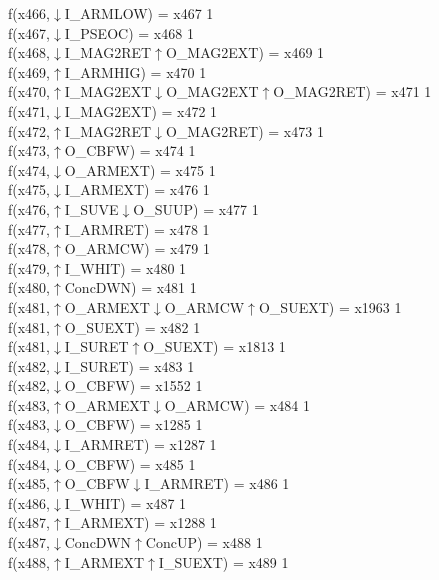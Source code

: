 f(x466,$\downarrow$I\_ARMLOW) = x467 {1} \\
f(x467,$\downarrow$I\_PSEOC) = x468 {1} \\
f(x468,$\downarrow$I\_MAG2RET$\uparrow$O\_MAG2EXT) = x469 {1} \\
f(x469,$\uparrow$I\_ARMHIG) = x470 {1} \\
f(x470,$\uparrow$I\_MAG2EXT$\downarrow$O\_MAG2EXT$\uparrow$O\_MAG2RET) = x471 {1} \\
f(x471,$\downarrow$I\_MAG2EXT) = x472 {1} \\
f(x472,$\uparrow$I\_MAG2RET$\downarrow$O\_MAG2RET) = x473 {1} \\
f(x473,$\uparrow$O\_CBFW) = x474 {1} \\
f(x474,$\downarrow$O\_ARMEXT) = x475 {1} \\
f(x475,$\downarrow$I\_ARMEXT) = x476 {1} \\
f(x476,$\uparrow$I\_SUVE$\downarrow$O\_SUUP) = x477 {1} \\
f(x477,$\uparrow$I\_ARMRET) = x478 {1} \\
f(x478,$\uparrow$O\_ARMCW) = x479 {1} \\
f(x479,$\uparrow$I\_WHIT) = x480 {1} \\
f(x480,$\uparrow$ConcDWN) = x481 {1} \\
f(x481,$\uparrow$O\_ARMEXT$\downarrow$O\_ARMCW$\uparrow$O\_SUEXT) = x1963 {1} \\
f(x481,$\uparrow$O\_SUEXT) = x482 {1} \\
f(x481,$\downarrow$I\_SURET$\uparrow$O\_SUEXT) = x1813 {1} \\
f(x482,$\downarrow$I\_SURET) = x483 {1} \\
f(x482,$\downarrow$O\_CBFW) = x1552 {1} \\
f(x483,$\uparrow$O\_ARMEXT$\downarrow$O\_ARMCW) = x484 {1} \\
f(x483,$\downarrow$O\_CBFW) = x1285 {1} \\
f(x484,$\downarrow$I\_ARMRET) = x1287 {1} \\
f(x484,$\downarrow$O\_CBFW) = x485 {1} \\
f(x485,$\uparrow$O\_CBFW$\downarrow$I\_ARMRET) = x486 {1} \\
f(x486,$\downarrow$I\_WHIT) = x487 {1} \\
f(x487,$\uparrow$I\_ARMEXT) = x1288 {1} \\
f(x487,$\downarrow$ConcDWN$\uparrow$ConcUP) = x488 {1} \\
f(x488,$\uparrow$I\_ARMEXT$\uparrow$I\_SUEXT) = x489 {1} \\
